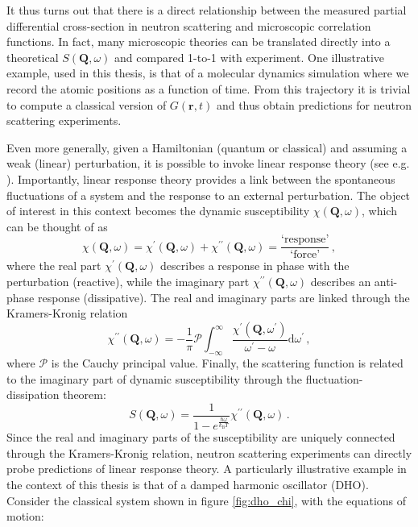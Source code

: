 It thus turns out that there is a direct relationship between the measured partial differential cross-section in neutron scattering and microscopic correlation functions. In fact, many microscopic theories can be translated directly into a theoretical $S(\bm{Q}, \omega)$ and compared 1-to-1 with experiment. One illustrative example, used in this thesis, is that of a molecular dynamics simulation where we record the atomic positions as a function of time. From this trajectory it is trivial to compute a classical version of $G(\bm{r},t)$ and thus obtain predictions for neutron scattering experiments.

Even more generally, given a Hamiltonian (quantum or classical) and assuming a weak (linear) perturbation, it is possible to invoke linear response theory (see e.g. \cite[chapter 3]{Jensen1991}). Importantly, linear response theory provides a link between the spontaneous fluctuations of a system and the response to an external perturbation. The object of interest in this context becomes the dynamic susceptibility $\chi(\bm{Q}, \omega)$, which can be thought of as
%
\[ \chi(\bm{Q}, \omega) = \chi^{\prime}(\bm{Q}, \omega) + \chi^{\prime\prime}(\bm{Q}, \omega) = \frac{\text{`response'}}{\text{`force'}} \, , \]
%
where the real part $\chi^{\prime}(\bm{Q}, \omega)$ describes a response in phase with the perturbation (reactive),
while the imaginary part $\chi^{\prime\prime}(\bm{Q}, \omega)$ describes an anti-phase response (dissipative). The real and imaginary parts are linked through the Kramers-Kronig relation
%
\[ \chi^{\prime\prime}(\bm{Q}, \omega) = - \frac{1}{\pi} \mathcal{P} \int_{-\infty}^{\infty} \frac{\chi^{\prime}(\bm{Q},\omega^\prime)}{\omega^\prime - \omega} \mathrm{d}\omega^\prime \, , \]
%
where $\mathcal{P}$ is the Cauchy principal value. Finally, the scattering function is related to the imaginary part of dynamic susceptibility through the fluctuation-dissipation theorem:
%
\[ S(\bm{Q},\omega) = \frac{1}{1-e^{\frac{\hbar\omega}{k_\text{B}T}}} \chi^{\prime\prime}(\bm{Q}, \omega) \, . \]
%
Since the real and imaginary parts of the susceptibility are uniquely connected through the Kramers-Kronig relation, neutron scattering experiments can directly probe predictions of linear response theory. A particularly illustrative example in the context of this thesis is that of a damped harmonic oscillator (DHO). Consider the classical system shown in figure \ref{fig:dho_chi}, with the equations of motion:

